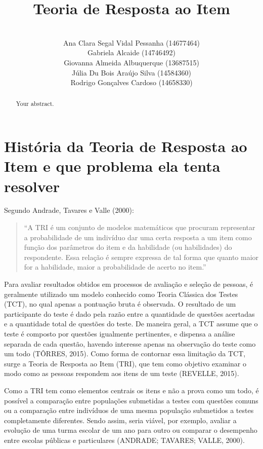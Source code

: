 \documentclass{article}
\title{Teoria de Resposta ao Item}
\author{\\Ana Clara Segal Vidal Pessanha (14677464)\\Gabriela Alcaide (14746492)\\Giovanna Almeida Albuquerque (13687515)\\Júlia Du Bois Araújo Silva (14584360)\\Rodrigo Gonçalves Cardoso (14658330)}
\begin{document}
\maketitle

\begin{abstract}
Your abstract.
\end{abstract}

\section{História da Teoria de Resposta ao Item e que problema ela tenta resolver}

Segundo Andrade, Tavares e Valle (2000): 
\begin{quote}
    “A TRI é um conjunto de modelos matemáticos que procuram representar a probabilidade de um indivíduo dar uma certa resposta a um item como função dos parâmetros do item e da habilidade (ou habilidades) do respondente. Essa relação é sempre expressa de tal forma que quanto maior for a habilidade, maior a probabilidade de acerto no item.”
\end{quote}

Para avaliar resultados obtidos em processos de avaliação e seleção de pessoas, é geralmente utilizado um modelo conhecido como Teoria Clássica dos Testes (TCT), no qual apenas a pontuação bruta é observada. O resultado de um participante do teste é dado pela razão entre a quantidade de questões acertadas e a quantidade total de questões do teste. De maneira geral, a TCT assume que o teste é composto por questões igualmente pertinentes, e dispensa a análise separada de cada questão, havendo interesse apenas na observação do teste como um todo (TÔRRES, 2015). Como forma de contornar essa limitação da TCT, surge a Teoria de Resposta ao Item (TRI), que tem como objetivo examinar o modo como as pessoas respondem aos itens de um teste (REVELLE, 2015). 

Como a TRI tem como elementos centrais os itens e não a prova como um todo, é possível a comparação entre populações submetidas a testes com questões comuns ou a comparação entre indivíduos de uma mesma população submetidos a testes completamente diferentes. Sendo assim, seria viável, por exemplo, avaliar a evolução de uma turma escolar de um ano para outro ou comparar o desempenho entre escolas públicas e particulares (ANDRADE; TAVARES; VALLE, 2000).
\end{document}
